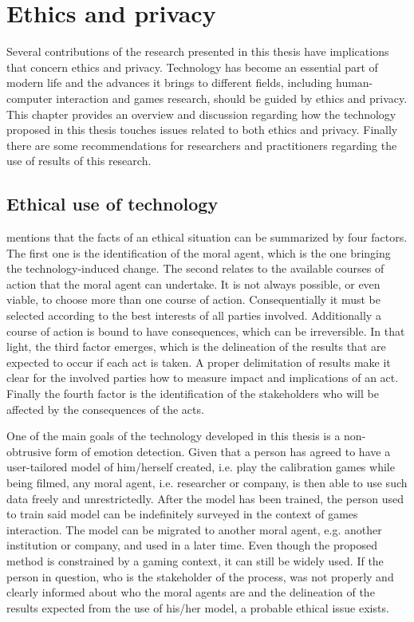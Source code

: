 \chapter{Ethics and privacy}
\label{ch:ethics}

Several contributions of the research presented in this thesis have implications that concern ethics and privacy. Technology has become an essential part of modern life and the advances it brings to different fields, including human-computer interaction and games research, should be guided by ethics and privacy. This chapter provides an overview and discussion regarding how the technology proposed in this thesis touches issues related to both ethics and privacy. Finally there are some recommendations for researchers and practitioners regarding the use of results of this research.

\section{Ethical use of technology}

\textcite{mason1995applying} mentions that the facts of an ethical situation can be summarized by four factors. The first one is the identification of the moral agent, which is the one bringing the technology-induced change. The second relates to the available courses of action that the moral agent can undertake. It is not always possible, or even viable, to choose more than one course of action. Consequentially it must be selected according to the best interests of all parties involved. Additionally a course of action is bound to have consequences, which can be irreversible. In that light, the third factor emerges, which is the delineation of the results that are expected to occur if each act is taken. A proper delimitation of results make it clear for the involved parties how to measure impact and implications of an act. Finally the fourth factor is the identification of the stakeholders who will be affected by the consequences of the acts.

One of the main goals of the technology developed in this thesis is a non-obtrusive form of emotion detection. Given that a person has agreed to have a user-tailored model of him/herself created, i.e. play the calibration games while being filmed, any moral agent, i.e. researcher or company, is then able to use such data freely and unrestrictedly. After the model has been trained, the person used to train said model can be indefinitely surveyed in the context of games interaction. The model can be migrated to another moral agent, e.g. another institution or company, and used in a later time. Even though the proposed method is constrained by a gaming context, it can still be widely used. If the person in question, who is the stakeholder of the process, was not properly and clearly informed about who the moral agents are and the delineation of the results expected from the use of his/her model, a probable ethical issue exists.

